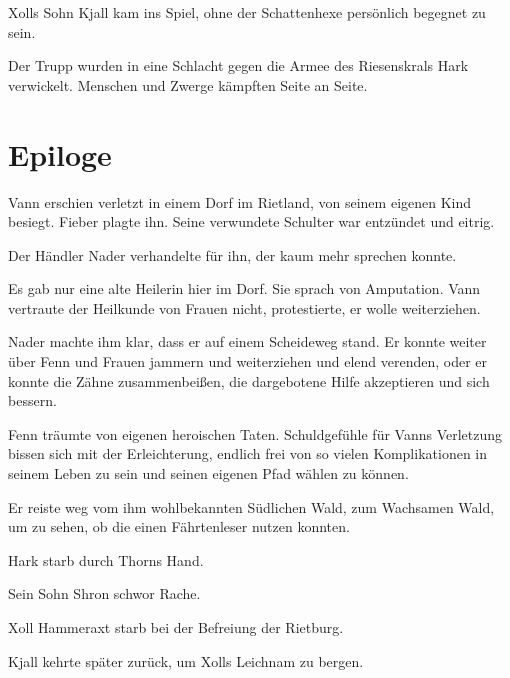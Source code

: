 Xolls Sohn Kjall kam ins Spiel, ohne der Schattenhexe persönlich begegnet zu sein.

Der Trupp wurden in eine Schlacht gegen die Armee des Riesenskrals Hark verwickelt. Menschen und Zwerge kämpften Seite an Seite.




\newpage
\section{Epiloge}




Vann erschien verletzt in einem Dorf im Rietland, von seinem eigenen Kind besiegt. Fieber plagte ihn. Seine verwundete Schulter war entzündet und eitrig.

Der Händler Nader verhandelte für ihn, der kaum mehr sprechen konnte.

Es gab nur eine alte Heilerin hier im Dorf. Sie sprach von Amputation. Vann vertraute der Heilkunde von Frauen nicht, protestierte, er wolle weiterziehen.

Nader machte ihm klar, dass er auf einem Scheideweg stand. Er konnte weiter über Fenn und Frauen jammern und weiterziehen und elend verenden, oder er konnte die Zähne zusammenbeißen, die dargebotene Hilfe akzeptieren und sich bessern.



\trennzeichen

Fenn träumte von eigenen heroischen Taten.  Schuldgefühle für Vanns Verletzung bissen sich mit der Erleichterung, endlich frei von so vielen Komplikationen in seinem Leben zu sein und seinen eigenen Pfad wählen zu können.

Er reiste weg vom ihm wohlbekannten Südlichen Wald, zum Wachsamen Wald, um zu sehen, ob die  einen Fährtenleser nutzen konnten.


\trennzeichen

Hark starb durch Thorns Hand.

\trennzeichen

Sein Sohn Shron schwor Rache.



\trennzeichen

Xoll Hammeraxt starb bei der Befreiung der Rietburg.

\trennzeichen


Kjall kehrte später zurück, um Xolls Leichnam zu bergen.






